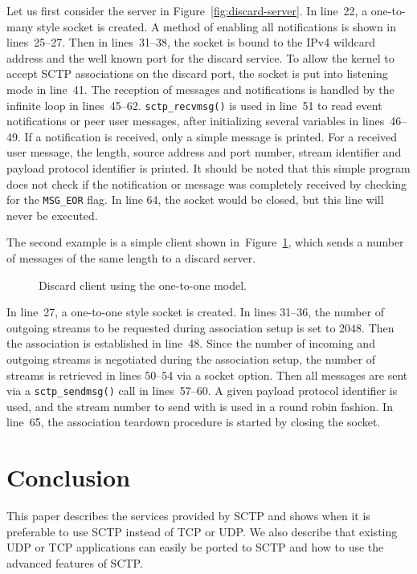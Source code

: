\documentclass[conference]{IEEEtran}
\begin{document}
Let us first consider the server in Figure~\ref{fig:discard-server}.
In line~22, a one-to-many style socket is created. A method of enabling
all notifications is shown in lines~25--27. Then in lines~31--38,
the socket is bound to the IPv4 wildcard address and the well known port
for the discard service. To allow the kernel to accept SCTP
associations on the discard port, the socket is put into listening
mode in line~41. 
The reception of messages and notifications is handled by the
infinite loop in lines~45--62. \texttt{sctp\_recvmsg()} is used in 
line~51 to read event notifications or peer user messages, after initializing
several variables in lines~46--49. If a notification is received,
only a simple message is printed. For a received user message, the
length, source address and port number, stream identifier and
payload protocol identifier is printed. It should be noted that
this simple program does not check if the notification or message
was completely received by checking for the \texttt{MSG\_EOR} flag.
In line 64, the socket would be closed, but this line will never be
executed.

The second example is a simple client shown in~Figure~\ref{fig:discard-client},
which sends a number of messages of the same length to a discard server.

\begin{figure}[h]
\lstset{numbers=left, frame=single, basicstyle=\small\ttfamily}

\caption{Discard client using the one-to-one model.}
\label{fig:discard-client}
\end{figure}

In line~27, a one-to-one style socket is created. In lines 31--36, the
number of outgoing streams to be requested during association setup
is set to 2048. Then the association is established in line~48. Since 
the number of incoming and outgoing streams is negotiated during the
association setup, the number of streams is retrieved in lines 50--54
via a socket option. Then all messages are sent via a \texttt{sctp\_sendmsg()}
call in lines~57--60. A given payload protocol identifier is used, and the
stream number to send with is used in a round robin fashion. In line~65, the
association teardown procedure is started by closing the socket.

\section{Conclusion}
This paper describes the services provided by SCTP and shows
when it is preferable to use SCTP instead of TCP or UDP.
We also describe that existing UDP or TCP applications can
easily be ported to SCTP and how to use the advanced features
of SCTP.
\end{document}
